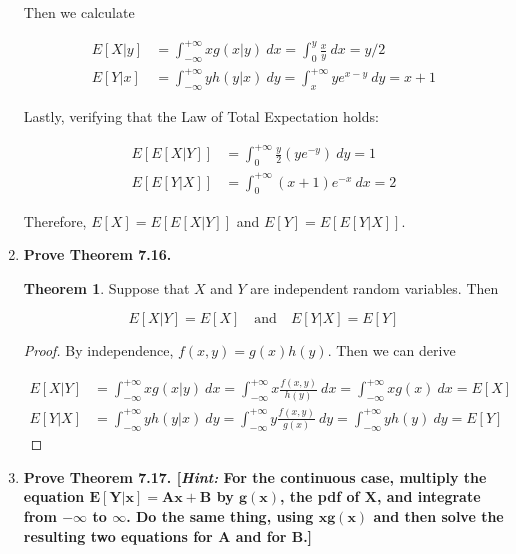 \documentclass[10pt, oneside]{article}   	%
\theoremstyle{definition}
\newtheorem*{thm*}{Theorem}
\begin{document}
\begin{enumerate}[label=7.\arabic*]
  Then we calculate
  
  \begin{align*}
  E[X | y] &= \int^{+\infty}_{-\infty} x g(x | y) \ dx = \int^y_0 \frac{x}{y} \ dx = \boxed{y/2} \\
  E[Y | x] &= \int^{+\infty}_{-\infty} y h(y | x) \ dy = \int^{+\infty}_x ye^{x-y} \ dy = \boxed{x + 1}
  \end{align*}
  
  Lastly, verifying that the Law of Total Expectation holds:
  
  \begin{align*}
  E[E[X | Y]] &= \int^{+\infty}_0 \frac{y}{2} (ye^{-y}) \ dy = \boxed{1} \\
  E[E[Y | X]] &= \int^{+\infty}_0 (x+1) e^{-x} \ dx = \boxed{2}
  \end{align*}
  
  Therefore, $E[X] = E[E[X | Y]]$ and $E[Y] = E[E[Y | X]]$.

\item  \begin{tcolorbox}[
  colback=Cerulean!5!white,
  colframe=Cerulean!75!black]
  \textbf{Prove Theorem 7.16.}
  \end{tcolorbox}
  
  \begin{thm*}
  Suppose that $X$ and $Y$ are independent random variables. Then
  
  \[ E[X | Y] = E[X] \quad \text{and} \quad E[Y | X] = E[Y] \]
  \end{thm*}
  
  \begin{proof}
  By independence, $f(x,y) = g(x) h(y)$. Then we can derive
  
  \begin{align*}
  E[X | Y] &= \int^{+\infty}_{-\infty} x g(x | y) \ dx = \int^{+\infty}_{-\infty} x \frac{f(x,y)}{h(y)} \ dx = \int^{+\infty}_{-\infty} x g(x) \ dx = E[X] \\
  E[Y | X] &= \int^{+\infty}_{-\infty} y h(y | x) \ dy = \int^{+\infty}_{-\infty} y \frac{f(x,y)}{g(x)} \ dy = \int^{+\infty}_{-\infty} y h(y) \ dy = E[Y]
  \end{align*}
  \end{proof}
  
\item  \begin{tcolorbox}[
  colback=Cerulean!5!white,
  colframe=Cerulean!75!black]
  \textbf{Prove Theorem 7.17. [\textit{Hint:} For the continuous case, multiply the equation $\bm{E[Y | x] = Ax + B}$ by $\bm{g(x)}$, the pdf of $\bm{X}$, and integrate from $\bm{-\infty}$ to $\bm{\infty}$. Do the same thing, using $\bm{xg(x)}$ and then solve the resulting two equations for $\bm{A}$ and for $\bm{B}$.]}
  \end{tcolorbox}
  

\end{enumerate}
\end{document}
